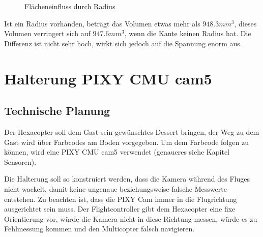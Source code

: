 			\begin{figure}[H]
				\begin{centering}
				\caption{Flächeneinfluss durch Radius}
				\par\end{centering}
				\label{klammer_radius}
			\end{figure}

	Ist ein Radius vorhanden, beträgt das Volumen etwas mehr als $948.3 mm^{3}$, dieses Volumen verringert sich auf $947.6 mm^{3}$, wenn die Kante keinen Radius hat. Die Differenz ist nicht sehr hoch, wirkt sich jedoch auf die Spannung enorm aus.

			\newpage

\section{Halterung PIXY CMU cam5}

	\subsection{Technische Planung}

	Der Hexacopter soll dem Gast sein gewünschtes Dessert bringen, der Weg zu dem Gast wird über Farbcodes am Boden vorgegeben.
	Um dem Farbcode folgen zu können, wird eine PIXY CMU cam5 verwendet (genaueres siehe Kapitel Sensoren).

	Die Halterung soll so konstruiert werden, dass die Kamera während des Fluges nicht wackelt, damit keine ungenaue beziehungsweise falsche Messwerte entstehen.
	Zu beachten ist, dass die PIXY Cam immer in die Flugrichtung ausgerichtet sein muss.
	Der Flightcontroller gibt dem Hexacopter eine fixe Orientierung vor, würde die Kamera nicht in diese Richtung messen, würde es zu Fehlmessung kommen und den Multicopter falsch navigieren.

